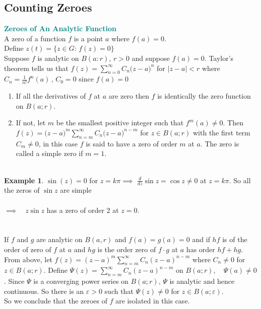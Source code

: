 \documentclass[11pt,a4paper]{article}
\theoremstyle{definition}
\newtheorem{example}[thm]{Example}
\begin{document}
{\color[wave]{485}\subsection{Counting Zeroes}}


\textbf{\textcolor{teal}{Zeroes of An Analytic Function}}\\
A zero of a function $f$ is a point $a$ where $f(a) = 0$.\\

Define $z(t) = \big\{z\in G:\, f(z) = 0\big\}$\\
Suppose $f$ is analytic on $B(a:r),\,r>0$ and suppose $f(a)= 0$.
Taylor's theorem tells us that $\displaystyle{f(z)  = \sum^{\infty}_{n=0} C_n \big(z - a\big)^n}$ for $\left|z - a\right|< r$ where $C_n = \frac{1}{n!}f^n(a)\,,\, C_0 = 0$ since $f(a) = 0$\\


\begin{enumerate}
\item[\textit{Case 1:}] If all the derivatives of $f$ at $a$ are zero then $f$ is identically the zero function on $B(a;r)$.
\item[\textit{Case 2:}] If not, let $m$ be  the smallest positive integer such that $f^m(a) \neq 0$. Then\\ $\displaystyle{f(z) = \big(z - a\big)^m\sum^{\infty}_{n = m} C_n \big(z - a\big)^{n - m}}$ for $z \in B(a;r)$ with the first term $C_m \neq 0$, in this case $f$ is said to have a zero of order $m$ at $a$. The zero is called a simple zero if $m= 1$.\\\\
\end{enumerate}






\begin{example}
$\sin (z) = 0$ for $z = k\pi\implies$
$\frac{d}{dz}\sin z = \cos z \neq 0$ at $z =k\pi$. 
So all the zeros of $\sin z$ are simple\\\\


$\implies\quad  z\sin z$ has a zero of order 2 at $z = 0$.\\\\\\


If $f$  and $g$ are analytic on $B(a,r)$ and $f(a) = g(a) = 0$ and if $hf$ is of the order of zero of $f$ at $a$ and $hg$ is the order zero of $f\cdot g$ at $a$ has order $hf + hg$.\\

From above, let $\displaystyle{f(z) = (z - a)^m\sum^{\infty}_{n=m}C_n(z - a)^{n-m}}$ where $C_n \neq 0$ for $z\in B(a;r)$. Define $\displaystyle{\Psi(z) = \sum^{\infty}_{n=m}C_n (z - a)^{n-m}}$ on $B(a;r),\quad \Psi (a) \neq 0$. Since $\Psi$ is a converging power series on $B(a;r),\, \Psi$ is analytic and hence continuous. So there is an $\varepsilon > 0$ such that $\Psi (z) \neq 0$ for $z\in B(a;\varepsilon)$.\\
So we conclude that the zeroes of $f$ are isolated in this case.
\end{example}
\end{document}
